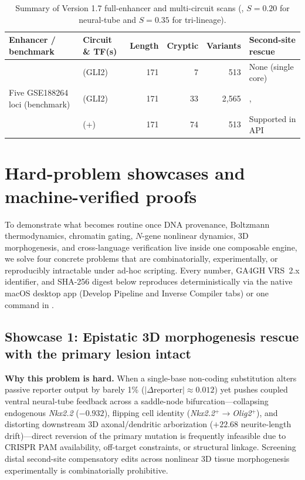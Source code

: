\documentclass[10.5pt,a4paper]{article}
\begin{document}
\begin{table}[tb]
\small
\caption{Summary of Version 1.7 full-enhancer and multi-circuit scans (, $S=0.20$ for neural-tube and $S=0.35$ for tri-lineage).}\label{tab:circuit}
\begin{tabular}{@{}L{41mm}L{38mm}rrrL{22mm}@{}}
\toprule
Enhancer / benchmark & Circuit \& TF(s) & Length & Cryptic & Variants & Second-site rescue \\
\midrule
{} &  (GLI2) & 171 & 7 & 513 & None (single core) \\
Five GSE188264 loci (benchmark) &  (GLI2) & 171 & 33 & 2,565 & ,  \\
 &  (+) & 171 & 74 & 513 & Supported in API \\
\bottomrule
\end{tabular}
\end{table}

\section{Hard-problem showcases and machine-verified proofs}\label{sec:showcases}

To demonstrate what becomes routine once DNA provenance, Boltzmann thermodynamics, chromatin gating, $N$-gene nonlinear dynamics, 3D morphogenesis, and cross-language verification live inside one composable engine, we solve four concrete problems that are combinatorially, experimentally, or reproducibly intractable under ad-hoc scripting. Every number, GA4GH VRS~2.x identifier, and SHA-256 digest below reproduces deterministically via the native macOS desktop app (Develop Pipeline and Inverse Compiler tabs) or one command in .

\subsection{Showcase 1: Epistatic 3D morphogenesis rescue with the primary lesion intact}

\textbf{Why this problem is hard.} When a single-base non-coding substitution alters passive reporter output by barely 1\% ($|\Delta\text{reporter}|\approx 0.012$) yet pushes coupled ventral neural-tube feedback across a saddle-node bifurcation—collapsing endogenous \emph{Nkx2.2} ($-0.932$), flipping cell identity (\emph{Nkx2.2}$^+\rightarrow$\emph{Olig2}$^+$), and distorting downstream 3D axonal/dendritic arborization ($+22.68$ neurite-length drift)—direct reversion of the primary mutation is frequently infeasible due to CRISPR PAM availability, off-target constraints, or structural linkage. Screening distal second-site compensatory edits across nonlinear 3D tissue morphogenesis experimentally is combinatorially prohibitive.
\end{document}
